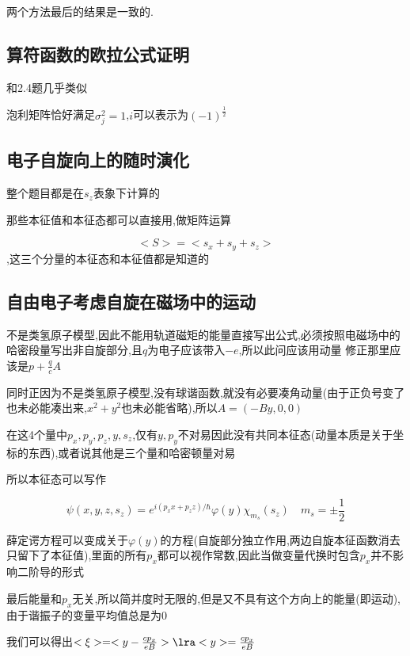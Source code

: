             两个方法最后的结果是一致的.



        \subsection{算符函数的欧拉公式证明}
            和2.4题几乎类似

            泡利矩阵恰好满足$ \sigma_{j}^{2} = 1 $,$i$可以表示为$ (-1)^{\frac{1}{2}} $

        \subsection{电子自旋向上的随时演化}
            整个题目都是在$s_{z}$表象下计算的

            那些本征值和本征态都可以直接用,做矩阵运算

            $$ <S> = <s_{x} + s_{y} + s_{z}> $$,这三个分量的本征态和本征值都是知道的

        \subsection{自由电子考虑自旋在磁场中的运动}

            不是类氢原子模型,因此不能用轨道磁矩的能量直接写出公式,必须按照电磁场中的哈密段量写出非自旋部分,且$q$为电子应该带入$-e$,所以此问应该用动量
            修正那里应该是$ p + \frac{q}{c}A $

            同时正因为不是类氢原子模型,没有球谐函数,就没有必要凑角动量(由于正负号变了也未必能凑出来,$x^{2}+y^{2}$也未必能省略),所以$A = (-By,0,0)$

            在这4个量中$p_{x},p_{y},p_{z},y,s_{z}$,仅有$y,p_{y}$不对易因此没有共同本征态(动量本质是关于坐标的东西),或者说其他是三个量和哈密顿量对易

            所以本征态可以写作

            $$ \psi(x,y,z,s_{z}) = e^{i(p_{x}x+p_{z}z)/\hbar} \varphi(y) \chi_{m_{s}}(s_{z}) \quad m_{s} = \pm \frac{1}{2} $$ 
            
            薛定谔方程可以变成关于$\varphi(y)$的方程(自旋部分独立作用,两边自旋本征函数消去只留下了本征值),里面的所有$p_{x}$都可以视作常数,因此当做变量代换时包含$p_{x}$并不影响二阶导的形式
            
            最后能量和$p_{x}$无关,所以简并度时无限的,但是又不具有这个方向上的能量(即运动),由于谐振子的变量平均值总是为0

            我们可以得出$ <\xi> = <y -\frac{cp_{x}}{eB}> \lra <y> = \frac{cp_{x}}{eB} $


